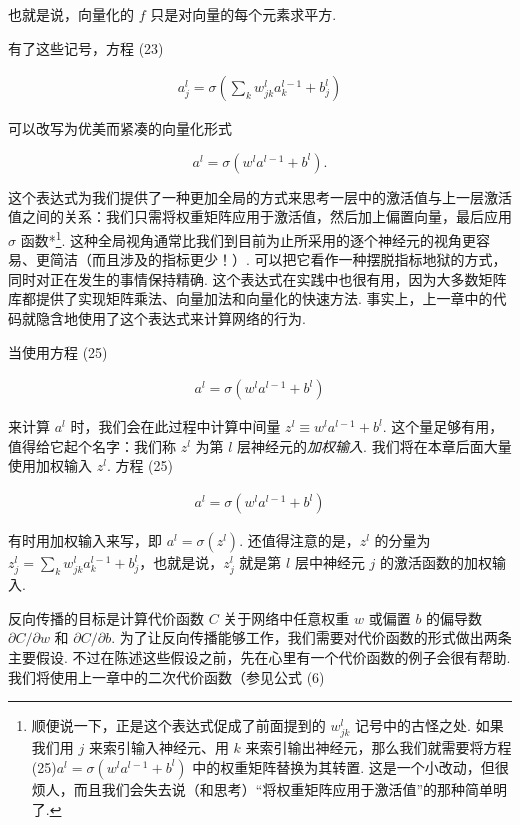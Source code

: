\noindent 也就是说，向量化的 $f$ 只是对向量的每个元素求平方.

有了这些记号，方程 (23)

\begin{align*}
a^{l}_j = \sigma\left( \sum_k w^{l}_{jk} a^{l-1}_k + b^l_j \right) \nonumber
\end{align*}

\noindent 可以改写为优美而紧凑的向量化形式

\begin{equation}
a^{l} = \sigma(w^l a^{l-1}+b^l).
\tag{25}
\end{equation}

\noindent 这个表达式为我们提供了一种更加全局的方式来思考一层中的激活值与上一层激活值之间的关系：我们只需将权重矩阵应用于激活值，然后加上偏置向量，最后应用 $\sigma$ 函数*\footnote{顺便说一下，正是这个表达式促成了前面提到的 $w^l_{jk}$ 记号中的古怪之处. 如果我们用 $j$ 来索引输入神经元、用 $k$ 来索引输出神经元，那么我们就需要将方程 (25)$a^{l} = \sigma(w^l a^{l-1}+b^l)$ 中的权重矩阵替换为其转置. 这是一个小改动，但很烦人，而且我们会失去说（和思考）``将权重矩阵应用于激活值''的那种简单明了.}. 这种全局视角通常比我们到目前为止所采用的逐个神经元的视角更容易、更简洁（而且涉及的指标更少！）. 可以把它看作一种摆脱指标地狱的方式，同时对正在发生的事情保持精确. 这个表达式在实践中也很有用，因为大多数矩阵库都提供了实现矩阵乘法、向量加法和向量化的快速方法. 事实上，上一章中的代码就隐含地使用了这个表达式来计算网络的行为.

当使用方程 (25)

\begin{align*}
a^{l} = \sigma(w^l a^{l-1}+b^l) \nonumber
\end{align*}

\noindent 来计算 $a^l$ 时，我们会在此过程中计算中间量 $z^l \equiv w^l a^{l-1}+b^l$. 这个量足够有用，值得给它起个名字：我们称 $z^l$ 为第 $l$ 层神经元的\emph{加权输入}. 我们将在本章后面大量使用加权输入 $z^l$. 方程 (25)

\begin{align*}
a^{l} = \sigma(w^l a^{l-1}+b^l) \nonumber
\end{align*}

\noindent 有时用加权输入来写，即 $a^l = \sigma(z^l)$. 还值得注意的是，$z^l$ 的分量为 $z^l_j = \sum_k w^l_{jk} a^{l-1}_k+b^l_j$，也就是说，$z^l_j$ 就是第 $l$ 层中神经元 $j$ 的激活函数的加权输入.

反向传播的目标是计算代价函数 $C$ 关于网络中任意权重 $w$ 或偏置 $b$ 的偏导数 $\partial C / \partial w$ 和 $\partial C / \partial b$. 为了让反向传播能够工作，我们需要对代价函数的形式做出两条主要假设. 不过在陈述这些假设之前，先在心里有一个代价函数的例子会很有帮助. 我们将使用上一章中的二次代价函数（参见公式 (6)

